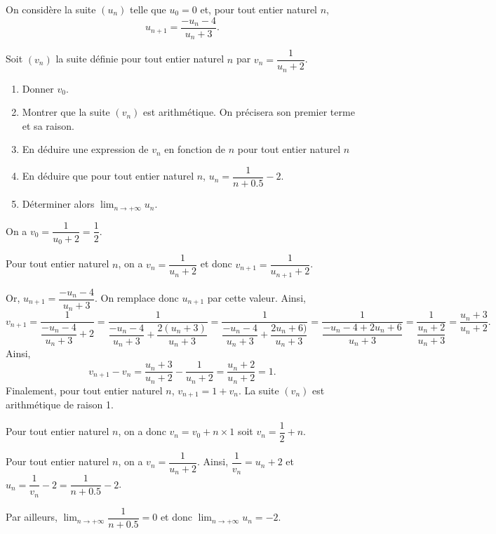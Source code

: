 \documentclass[11pt,fleqn]{book} %
\begin{document}
\begin{exercise}[topic=lim02, subtitle={(Nouvelle-Calédonie 2023)}]
On considère la suite $(u_n)$ telle que $u_0=0$ et, pour tout entier naturel $n$,
\[u_{n+1}=\dfrac{-u_n-4}{u_n+3}.\]

Soit $(v_n)$ la suite définie pour tout entier naturel $n$ par $v_n=\dfrac{1}{u_n+2}$.
\begin{enumerate}
\item Donner $v_0$.
\item Montrer que la suite $(v_n)$ est arithmétique. On précisera son premier terme et sa raison.
\item En déduire une expression de $v_n$ en fonction de $n$ pour tout entier naturel $n$
\item En déduire que pour tout entier naturel $n$, $u_n=\dfrac{1}{n+0.5}-2$.
\item Déterminer alors $\displaystyle\lim_{n \to +\infty}u_n$.
\end{enumerate}
\end{exercise}
\begin{solution}

On a $v_0=\dfrac{1}{u_0+2}=\dfrac{1}{2}$.

Pour tout entier naturel $n$, on a $v_n = \dfrac{1}{u_n+2}$ et donc $v_{n+1}=\dfrac{1}{u_{n+1}+2}$.

Or, $u_{n+1}=\dfrac{-u_n-4}{u_n+3}$. On remplace donc $u_{n+1}$ par cette valeur. Ainsi,
\[v_{n+1}=\dfrac{1}{\dfrac{-u_n-4}{u_n+3}+2}=\dfrac{1}{\dfrac{-u_n-4}{u_n+3}+\dfrac{2(u_n+3)}{u_n+3}}=\dfrac{1}{\dfrac{-u_n-4}{u_n+3}+\dfrac{2u_n+6)}{u_n+3}}=\dfrac{1}{\dfrac{-u_n-4+2u_n+6}{u_n+3}}=\dfrac{1}{\dfrac{u_n+2}{u_n+3}}=\dfrac{u_n+3}{u_n+2}.\]
Ainsi,
\[v_{n+1}-v_n = \dfrac{u_n+3}{u_n+2} - \dfrac{1}{u_n+2}=\dfrac{u_n+2}{u_n+2}=1.\]
Finalement, pour tout entier naturel $n$, $v_{n+1}=1+v_n$. La suite $(v_n)$ est arithmétique de raison 1.


Pour tout entier naturel $n$, on a donc $v_n=v_0 +n \times 1$ soit $v_n=\dfrac{1}{2}+n$.

Pour tout entier naturel $n$, on a $v_n=\dfrac{1}{u_n+2}$. Ainsi, $\dfrac{1}{v_n}=u_n+2$ et $u_n=\dfrac{1}{v_n}-2=\dfrac{1}{n+0.5}-2$.

Par ailleurs, $\displaystyle\lim_{n \to +\infty}\dfrac{1}{n+0.5}=0$ et donc $\displaystyle\lim_{n \to +\infty}u_n=-2$.
\end{solution}
\end{document}
